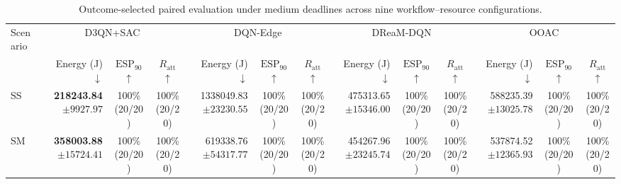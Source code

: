 \begin{table}[!t]
\centering
\caption{Outcome-selected paired evaluation under medium deadlines across nine workflow--resource configurations.}
\label{tab:conditional_full_medium}
\begingroup
\footnotesize
\setlength{\tabcolsep}{2.2pt}
\renewcommand{\arraystretch}{1.08}
\begin{tabular}{@{}l*{4}{rcc}@{}}
\toprule
Scenario & \multicolumn{3}{c}{D3QN+SAC} & \multicolumn{3}{c}{DQN-Edge} & \multicolumn{3}{c}{DReaM-DQN} & \multicolumn{3}{c}{OOAC} \\
\cmidrule(lr){2-4}\cmidrule(lr){5-7}\cmidrule(lr){8-10}\cmidrule(lr){11-13}
 & Energy (J) $\downarrow$ & $\mathrm{ESP}_{90}$ $\uparrow$ & $R_{\mathrm{att}}$ $\uparrow$ & Energy (J) $\downarrow$ & $\mathrm{ESP}_{90}$ $\uparrow$ & $R_{\mathrm{att}}$ $\uparrow$ & Energy (J) $\downarrow$ & $\mathrm{ESP}_{90}$ $\uparrow$ & $R_{\mathrm{att}}$ $\uparrow$ & Energy (J) $\downarrow$ & $\mathrm{ESP}_{90}$ $\uparrow$ & $R_{\mathrm{att}}$ $\uparrow$ \\
\midrule
SS & \shortstack[r]{\textbf{218243.84}\\$\pm 9927.97$} & \shortstack[c]{100\%\\(20/20)} & \shortstack[c]{100\%\\(20/20)} & \shortstack[r]{1338049.83\\$\pm 23230.55$} & \shortstack[c]{100\%\\(20/20)} & \shortstack[c]{100\%\\(20/20)} & \shortstack[r]{475313.65\\$\pm 15346.00$} & \shortstack[c]{100\%\\(20/20)} & \shortstack[c]{100\%\\(20/20)} & \shortstack[r]{588235.39\\$\pm 13025.78$} & \shortstack[c]{100\%\\(20/20)} & \shortstack[c]{100\%\\(20/20)} \\
SM & \shortstack[r]{\textbf{358003.88}\\$\pm 15724.41$} & \shortstack[c]{100\%\\(20/20)} & \shortstack[c]{100\%\\(20/20)} & \shortstack[r]{619338.76\\$\pm 54317.77$} & \shortstack[c]{100\%\\(20/20)} & \shortstack[c]{100\%\\(20/20)} & \shortstack[r]{454267.96\\$\pm 23245.74$} & \shortstack[c]{100\%\\(20/20)} & \shortstack[c]{100\%\\(20/20)} & \shortstack[r]{537874.52\\$\pm 12365.93$} & \shortstack[c]{100\%\\(20/20)} & \shortstack[c]{100\%\\(20/20)} \\

\end{tabular}
\end{table}

